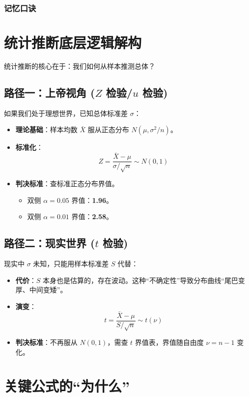 \documentclass[lang=cn,10pt]{elegantbook}
\begin{document}
\subsubsection{记忆口诀}

\section{统计推断底层逻辑解构}

统计推断的核心在于：我们如何从样本推测总体？

\subsection{路径一：上帝视角 ($Z$ 检验/$u$ 检验)}
如果我们处于理想世界，已知总体标准差 $\sigma$：
\begin{itemize}
    \item \textbf{理论基础}：样本均数 $\bar{X}$ 服从正态分布 $N(\mu, \sigma^2/n)$。
    \item \textbf{标准化}：
    \[ Z = \frac{\bar{X} - \mu}{\sigma/\sqrt{n}} \sim N(0,1) \]
    \item \textbf{判决标准}：查标准正态分布界值。
    \begin{itemize}
        \item 双侧 $\alpha=0.05$ 界值：\textbf{1.96}。
        \item 双侧 $\alpha=0.01$ 界值：\textbf{2.58}。
    \end{itemize}
\end{itemize}

\subsection{路径二：现实世界 ($t$ 检验)}
现实中 $\sigma$ 未知，只能用样本标准差 $S$ 代替：
\begin{itemize}
    \item \textbf{代价}：$S$ 本身也是估算的，存在波动。这种“不确定性”导致分布曲线“尾巴变厚、中间变矮”。
    \item \textbf{演变}：
    \[ t = \frac{\bar{X} - \mu}{S/\sqrt{n}} \sim t(\nu) \]
    \item \textbf{判决标准}：不再服从 $N(0,1)$，需查 $t$ 界值表，界值随自由度 $\nu = n-1$ 变化。
\end{itemize}

\section{关键公式的“为什么”}
\end{document}

